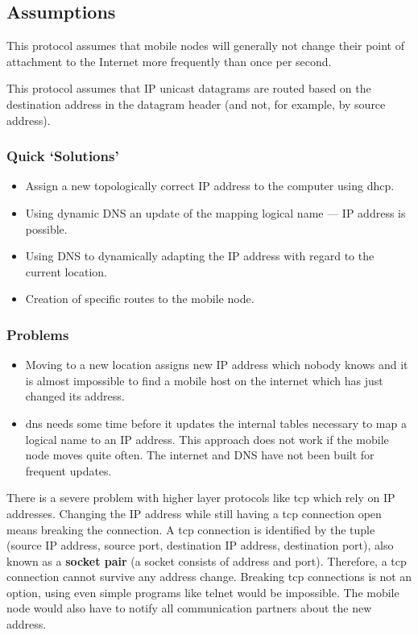 	
\subsection{Assumptions}
This protocol assumes that mobile nodes will generally not change their point of attachment to the Internet more frequently than once per second.

This protocol assumes that IP unicast datagrams are routed based on the destination address in the datagram header (and not, for example,
by source address).
\subsubsection*{Quick `Solutions'}
\begin{itemize}
	\item Assign a new topologically correct IP address to the computer using \gls{dhcp}.
	\item Using dynamic DNS an update of the mapping logical name — IP address is possible.
	\item Using DNS to dynamically adapting the IP address with regard to the current location.
	\item Creation of specific routes to the mobile node.
\end{itemize}
 
\subsubsection*{Problems}
\begin{itemize}
	\item Moving to a new location assigns new IP address which nobody knows and it is almost impossible to find a mobile host on the internet which has just changed its address.
	\item \gls{dns} needs some time before it updates the internal tables necessary to map a logical name to an IP address. This approach does not work if the mobile node moves quite often. The internet and DNS have not been built for frequent updates.
\end{itemize}

There is a severe problem with higher layer protocols like \gls{tcp} which rely on IP addresses. Changing the IP address while still having a \gls{tcp} connection open
means breaking the connection. A \gls{tcp} connection is identified by the tuple (source IP address, source port, destination IP address, destination port), also
known as a \textbf{socket pair} (a socket consists of address and port). Therefore, a \gls{tcp} connection cannot survive any address change. Breaking \gls{tcp} connections is not an
option, using even simple programs like telnet would be impossible. The mobile node would also have to notify all communication partners about the new address.

